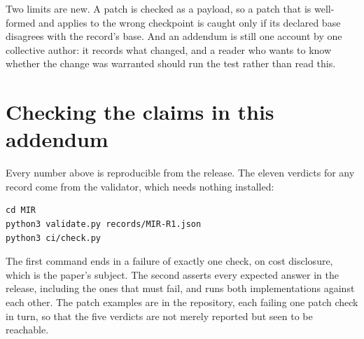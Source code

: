 \documentclass[11pt]{article}
\begin{document}
Two limits are new. A patch is checked as a payload, so a patch that is
well-formed and applies to the wrong checkpoint is caught only if its declared
base disagrees with the record's base. And an addendum is still one account by
one collective author: it records what changed, and a reader who wants to know
whether the change was warranted should run the test rather than read this.

\section{Checking the claims in this addendum}

Every number above is reproducible from the release. The eleven verdicts for
any record come from the validator, which needs nothing installed:

\begin{verbatim}
cd MIR
python3 validate.py records/MIR-R1.json
python3 ci/check.py
\end{verbatim}

The first command ends in a failure of exactly one check, on cost disclosure,
which is the paper's subject. The second asserts every expected answer in the
release, including the ones that must fail, and runs both implementations
against each other. The patch examples are in the repository, each failing one
patch check in turn, so that the five verdicts are not merely reported but seen
to be reachable.
\end{document}
